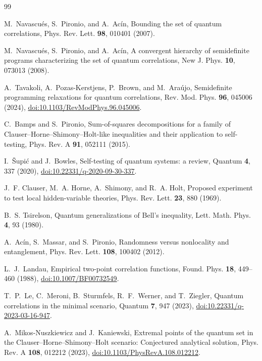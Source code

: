 \begin{thebibliography}{99}

M.~Navascu\'es, S.~Pironio, and A.~Ac\'in,
Bounding the set of quantum correlations,
Phys. Rev. Lett. \textbf{98}, 010401 (2007).

M.~Navascu\'es, S.~Pironio, and A.~Ac\'in,
A convergent hierarchy of semidefinite programs characterizing the set of quantum correlations,
New J. Phys. \textbf{10}, 073013 (2008).

A.~Tavakoli, A.~Pozas-Kerstjens, P.~Brown, and M.~Ara\'ujo, Semidefinite programming relaxations for quantum correlations, Rev. Mod. Phys. \textbf{96}, 045006 (2024), \href{https://doi.org/10.1103/RevModPhys.96.045006}{doi:10.1103/RevModPhys.96.045006}.

C.~Bamps and S.~Pironio,
Sum-of-squares decompositions for a family of Clauser--Horne--Shimony--Holt-like inequalities and their application to self-testing,
Phys. Rev. A \textbf{91}, 052111 (2015).

I.~\v{S}upi\'c and J.~Bowles,
Self-testing of quantum systems: a review,
Quantum \textbf{4}, 337 (2020),
\href{https://doi.org/10.22331/q-2020-09-30-337}{doi:10.22331/q-2020-09-30-337}.

J.~F. Clauser, M.~A. Horne, A.~Shimony, and R.~A. Holt,
Proposed experiment to test local hidden-variable theories,
Phys. Rev. Lett. \textbf{23}, 880 (1969).

B.~S. Tsirelson,
Quantum generalizations of Bell's inequality,
Lett. Math. Phys. \textbf{4}, 93 (1980).

A.~Ac\'in, S.~Massar, and S.~Pironio,
Randomness versus nonlocality and entanglement,
Phys. Rev. Lett. \textbf{108}, 100402 (2012).

L.~J.~Landau,
Empirical two-point correlation functions,
Found. Phys. \textbf{18}, 449--460 (1988),
\href{https://doi.org/10.1007/BF00732549}{doi:10.1007/BF00732549}.

T.~P.~Le, C.~Meroni, B.~Sturmfels, R.~F.~Werner, and T.~Ziegler,
Quantum correlations in the minimal scenario,
Quantum \textbf{7}, 947 (2023),
\href{https://doi.org/10.22331/q-2023-03-16-947}{doi:10.22331/q-2023-03-16-947}.

A.~Mikos-Nuszkiewicz and J.~Kaniewski,
Extremal points of the quantum set in the Clauser--Horne--Shimony--Holt scenario: Conjectured analytical solution,
Phys. Rev. A \textbf{108}, 012212 (2023),
\href{https://doi.org/10.1103/PhysRevA.108.012212}{doi:10.1103/PhysRevA.108.012212}.


\end{thebibliography}
